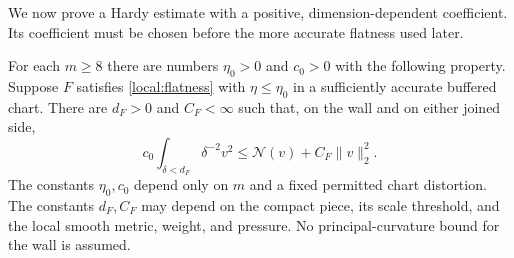We now prove a Hardy estimate with a positive, dimension-dependent
coefficient.  Its coefficient must be chosen before the more accurate
flatness used later.

\begin{lemma}\label{local:rough}
For each $m\ge8$ there are numbers $\eta_0>0$ and $c_0>0$ with the
following property.  Suppose $F$ satisfies \eqref{local:flatness}
with $\eta\le\eta_0$ in a sufficiently accurate buffered chart.
There are $d_F>0$ and $C_F<\infty$ such that, on the wall and on
either joined side,
\begin{equation}\label{local:rough-estimate}
 c_0\int_{\delta<d_F}\delta^{-2}v^2
             \le\mathcal N(v)+C_F\|v\|_2^2.
\end{equation}
The constants $\eta_0,c_0$ depend only on $m$ and a fixed permitted
chart distortion.  The constants $d_F,C_F$ may depend on the compact
piece, its scale threshold, and the local smooth metric, weight,
and pressure.  No principal-curvature bound for the wall is assumed.
\end{lemma}
